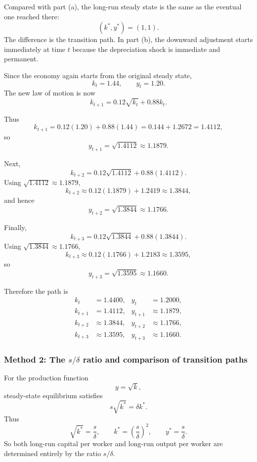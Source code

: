 \documentclass[12pt]{article}
\begin{document}
\begin{enumerate}[label=(\alph*)]
    Compared with part (a), the long-run steady state is the same as the eventual one reached there:
    \[
    (k^*,y^*)=(1,1).
    \]
    The difference is the transition path. In part (b), the downward adjustment starts immediately at time \(t\) because the depreciation shock is immediate and permanent.

    Since the economy again starts from the original steady state,
    \[
    k_t=1.44,
    \qquad
    y_t=1.20.
    \]
    The new law of motion is now
    \[
    k_{t+1}=0.12\sqrt{k_t}+0.88k_t.
    \]

    Thus
    \[
    k_{t+1}=0.12(1.20)+0.88(1.44)=0.144+1.2672=1.4112,
    \]
    so
    \[
    y_{t+1}=\sqrt{1.4112}\approx 1.1879.
    \]

    Next,
    \[
    k_{t+2}=0.12\sqrt{1.4112}+0.88(1.4112).
    \]
    Using \(\sqrt{1.4112}\approx 1.1879\),
    \[
    k_{t+2}\approx 0.12(1.1879)+1.2419\approx 1.3844,
    \]
    and hence
    \[
    y_{t+2}=\sqrt{1.3844}\approx 1.1766.
    \]

    Finally,
    \[
    k_{t+3}=0.12\sqrt{1.3844}+0.88(1.3844).
    \]
    Using \(\sqrt{1.3844}\approx 1.1766\),
    \[
    k_{t+3}\approx 0.12(1.1766)+1.2183\approx 1.3595,
    \]
    so
    \[
    y_{t+3}=\sqrt{1.3595}\approx 1.1660.
    \]

    Therefore the path is
    \[
    \boxed{
    \begin{aligned}
    k_t&=1.4400, & y_t&=1.2000,\\
    k_{t+1}&=1.4112, & y_{t+1}&\approx 1.1879,\\
    k_{t+2}&\approx 1.3844, & y_{t+2}&\approx 1.1766,\\
    k_{t+3}&\approx 1.3595, & y_{t+3}&\approx 1.1660.
    \end{aligned}}
    \]
\end{enumerate}

\subsubsection{Method 2: The \(s/\delta\) ratio and comparison of transition paths}
For the production function
\[
y=\sqrt{k},
\]
steady-state equilibrium satisfies
\[
s\sqrt{k^*}=\delta k^*.
\]
Thus
\[
\sqrt{k^*}=\frac{s}{\delta},
\qquad
k^*=\left(\frac{s}{\delta}\right)^2,
\qquad
y^*=\frac{s}{\delta}.
\]
So both long-run capital per worker and long-run output per worker are determined entirely by the ratio \(s/\delta\).
\end{document}

